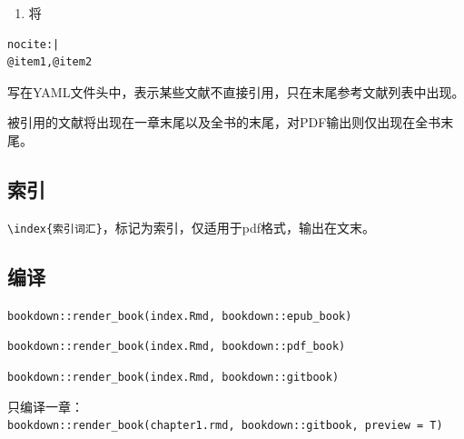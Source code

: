 \documentclass[]{article}
\providecommand{\tightlist}{%
  \setlength{\itemsep}{0pt}\setlength{\parskip}{0pt}}
\begin{document}
\begin{enumerate}
\def\labelenumi{\arabic{enumi}.}
\setcounter{enumi}{1}
\tightlist
\item
  将
\end{enumerate}

\begin{verbatim}
nocite:|
@item1,@item2
\end{verbatim}

写在YAML文件头中，表示某些文献不直接引用，只在末尾参考文献列表中出现。

被引用的文献将出现在一章末尾以及全书的末尾，对PDF输出则仅出现在全书末尾。

\hypertarget{section-29}{%
\subsection{索引}\label{section-29}}

\texttt{\textbackslash{}index\{索引词汇\}}，标记为索引，仅适用于pdf格式，输出在文末。

\hypertarget{section-30}{%
\subsection{编译}\label{section-30}}

\texttt{bookdown::render\_book(\textquotesingle{}index.Rmd\textquotesingle{},\ \textquotesingle{}bookdown::epub\_book\textquotesingle{})}

\texttt{bookdown::render\_book(\textquotesingle{}index.Rmd\textquotesingle{},\ \textquotesingle{}bookdown::pdf\_book\textquotesingle{})}

\texttt{bookdown::render\_book(\textquotesingle{}index.Rmd\textquotesingle{},\ \textquotesingle{}bookdown::gitbook\textquotesingle{})}

只编译一章：\\
\texttt{bookdown::render\_book(\textquotesingle{}chapter1.rmd\textquotesingle{},\ \textquotesingle{}bookdown::gitbook\textquotesingle{},\ preview\ =\ T)}


\end{document}
